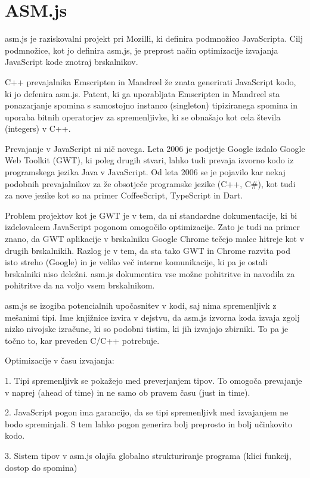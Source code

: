 \chapter{ASM.js}

asm.js je raziskovalni projekt pri Mozilli, ki definira podmnožico JavaScripta. Cilj podmnožice, kot jo definira asm.js, je preprost način optimizacije izvajanja JavaScript kode znotraj brskalnikov. 

C++ prevajalnika Emscripten in Mandreel že znata generirati JavaScript kodo, ki jo defenira asm.js. Patent, ki ga uporabljata Emscripten in Mandreel sta ponazarjanje spomina s samostojno instanco (singleton) tipiziranega spomina in uporaba bitnih operatorjev za spremenljivke, ki se obnašajo kot cela števila (integers) v C++.

Prevajanje v JavaScript ni nič novega. Leta 2006 je podjetje Google izdalo Google Web Toolkit (GWT), ki poleg drugih stvari, lahko  tudi prevaja izvorno kodo iz programskega jezika Java v JavaScript. Od leta 2006 se je pojavilo kar nekaj podobnih prevajalnikov za že obsotječe programske jezike (C++, C\#), kot tudi za nove jezike kot so na primer CoffeeScript, TypeScript in Dart.

Problem projektov kot je GWT je v tem, da ni standardne dokumentacije, ki bi izdelovalcem JavaScript pogonom omogočilo optimizacije. Zato je tudi na primer znano, da GWT aplikacije v brskalniku Google Chrome tečejo malce hitreje kot v drugih brskalnikih. Razlog je v tem, da sta tako GWT in Chrome razvita pod isto streho (Google) in je veliko več interne komunikacije, ki pa je ostali brskalniki niso deležni. asm.js dokumentira vse možne pohitritve in navodila za pohitritve da na voljo vsem brskalnikom.

asm.js se izogiba potencialnih upočasnitev v kodi, saj nima spremenljivk z mešanimi tipi. Ime knjižnice izvira v dejstvu, da asm.js izvorna koda izvaja zgolj nizko nivojske izračune, ki so podobni tistim, ki jih izvajajo zbirniki. To pa je točno to, kar preveden C/C++ potrebuje.

Optimizacije v času izvajanja:

1. Tipi spremenljivk se pokažejo med preverjanjem tipov. To omogoča prevajanje v naprej (ahead of time) in ne samo ob pravem času (just in time).

2. JavaScript pogon ima garancijo, da se tipi spremenljivk med izvajanjem ne bodo spreminjali. S tem lahko pogon generira bolj preprosto in bolj učinkovito kodo.

3. Sistem tipov v asm.js olajša globalno strukturiranje programa (klici funkcij, dostop do spomina)

